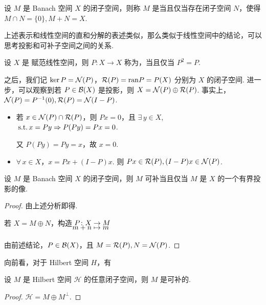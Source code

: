 \begin{definition}
    设 $M$ 是 Banach 空间 $X$ 的闭子空间，则称 $M$ 是当且仅当存在闭子空间 $N$，使得 $M \cap N = \{0\}, M + N = X$.
\end{definition}

上述表示和线性空间的直和分解的表述类似，那么类似于线性空间中的结论，可以思考投影和可补子空间之间的关系.

\begin{definition}[投影]
    设 $X$ 是 赋范线性空间，则 $P\colon X \to X$ 称为，当且仅当 $P^2 = P$.
\end{definition}

之后，我们记 $\ker P = \mathcal{N}(P)$，$\mathcal{R}(P)=\mathrm{ran} P = P(X)$ 分别为 $X$ 的闭子空间.
进一步，可以观察到若 $P \in \mathcal{B}(X)$ 是投影，则 $X = \mathcal{N}(P) \oplus \mathcal{R}(P)$.
事实上，$\mathcal{N}(P) = P^{-1}(0), \mathcal{R}(P) = \mathcal{N}(I-P)$.
\begin{itemize}[label=$\circ$]
    \item 若 $x \in \mathcal{N}(P) \cap \mathcal{R}(P)$，则 $Px = 0$，且 $\exists\, y \in X$, $\operatorname{\,\text{s.t.}} x = Py \Rightarrow P(Py) = Px = 0$.\par
    又 $P(Py) = Py = x$，故 $x = 0$.
    \item $\forall\, x \in X$，$x = Px + (I - P)x$. 则 $Px \in \mathcal{R}(P), (I - P)x \in \mathcal{N}(P)$.
\end{itemize}

\begin{theorem}
    设 $M$ 是 Banach 空间 $X$ 的闭子空间，则 $M$ 可补当且仅当 $M$ 是 $X$ 的一个有界投影的像.
\end{theorem}
\begin{proof}
    \fbox{$\Leftarrow$} 由上述分析即得.\par
    \fbox{$\Rightarrow$} 若 $X = M \oplus N$，构造$\setjot[-6]\begin{aligned}[t]
        P\colon X &\to M \\
        m + n &\mapsto m
    \end{aligned}$\par
    由前述结论，$P \in \mathcal{B}(X)$，且 $M = \mathcal{R}(P), N = \mathcal{N}(P)$.
\end{proof}

向前看，对于 Hilbert 空间 $H$，有
\begin{proposition}
    设 $M$ 是 Hilbert 空间 $\mathcal{H}$ 的任意闭子空间，则 $M$ 是可补的.
\end{proposition}
\begin{proof}
    $\mathcal{H} = M \oplus M^\perp$.
\end{proof}

